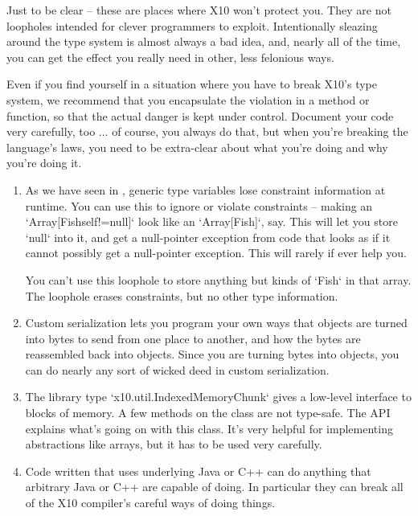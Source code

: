 Just to be clear -- these are places where X10 won't protect you.  They are
not loopholes intended for clever programmers to exploit.  
Intentionally sleazing around the type system is almost always a bad idea,
and, nearly all of the time, you can get the effect you really need in other,
less felonious ways.

Even if you find yourself in a situation where you have to break X10's type
system, we recommend that you encapsulate the violation in a method or
function, so that the actual danger is kept under control.  Document your code
very carefully, too ... of course, you always do that, but when you're
breaking the language's laws, you need to be extra-clear about what you're
doing and why you're doing it.

\begin{enumerate}

\item As we have seen in , generic type variables lose
      constraint information at runtime.  You can use this to ignore or
      violate constraints -- making an \xcd`Array[Fish{self!=null}]` look like
      an \xcd`Array[Fish]`, say.  This will let you store \xcd`null` into it,
      and get a null-pointer exception from code that looks as if it cannot
      possibly get a null-pointer exception.  This will rarely if ever help you.

      You can't use this loophole to store anything but kinds of \xcd`Fish` in
      that array. The loophole erases constraints, but no other type
      information.

\item Custom serialization lets you program your own ways that objects are
      turned into bytes to send from one place to another, and how the bytes
      are reassembled back into objects.  Since you are turning bytes into
      objects, you can do nearly any sort of wicked deed in custom
      serialization.  

\item The library type \xcd`x10.util.IndexedMemoryChunk` gives a low-level
      interface to blocks of memory.  A few methods on the class are not
      type-safe. The API explains what's going on with this class.  It's very
      helpful for implementing abstractions like arrays, but it has to be used
      very carefully.

\item Code written that uses underlying Java or C++ can do anything that
      arbitrary Java or C++ are capable of doing.  In particular they can
      break all of the X10 compiler's careful ways of doing things.  

\end{enumerate}

